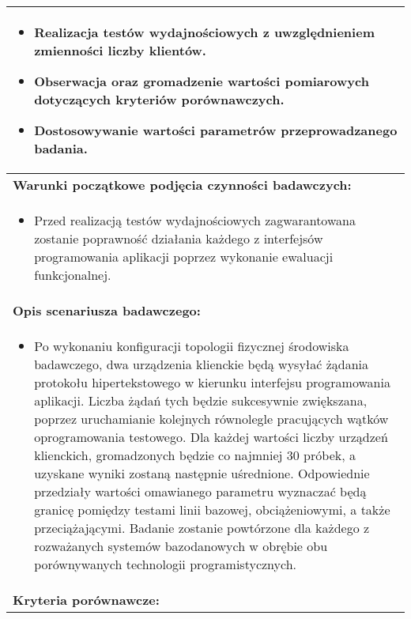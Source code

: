 \begin{longtable}[c]{|llll|}
    \multicolumn{4}{|p{\linewidth}|}{
        \begin{itemize}
            \item Realizacja testów wydajnościowych z uwzględnieniem zmienności liczby klientów.
            \item Obserwacja oraz gromadzenie wartości pomiarowych dotyczących kryteriów porównawczych.
            \item Dostosowywanie wartości parametrów przeprowadzanego badania.
        \end{itemize}
    }                                                           \\ \hline
    \multicolumn{4}{|l|}{\textbf{Warunki początkowe podjęcia czynności badawczych:}} \\ \hline
    \multicolumn{4}{|p{\linewidth}|}{
        \begin{itemize}[label={}]
            \item Przed realizacją testów wydajnościowych zagwarantowana zostanie poprawność działania każdego z interfejsów programowania aplikacji poprzez wykonanie ewaluacji funkcjonalnej.
          \end{itemize}
    }                                                           \\ \hline
    \multicolumn{4}{|l|}{\textbf{Opis scenariusza badawczego:}}                      \\ \hline
    \multicolumn{4}{|p{\linewidth}|}{
        \begin{itemize}[label={}]
            \item Po wykonaniu konfiguracji topologii fizycznej środowiska badawczego, dwa urządzenia klienckie będą wysyłać żądania protokołu hipertekstowego w kierunku interfejsu programowania aplikacji. Liczba żądań tych będzie sukcesywnie zwiększana, poprzez uruchamianie kolejnych równolegle pracujących wątków oprogramowania testowego. Dla każdej wartości liczby urządzeń klienckich, gromadzonych będzie co najmniej 30 próbek, a uzyskane wyniki zostaną następnie uśrednione. Odpowiednie przedziały wartości omawianego parametru wyznaczać będą granicę pomiędzy testami linii bazowej, obciążeniowymi, a także przeciążającymi. Badanie zostanie powtórzone dla każdego z rozważanych systemów bazodanowych w obrębie obu porównywanych technologii programistycznych.
          \end{itemize}
    }                                                           \\ \hline
    \multicolumn{4}{|l|}{\textbf{Kryteria porównawcze:}}                             \\ \hline

\end{longtable}

